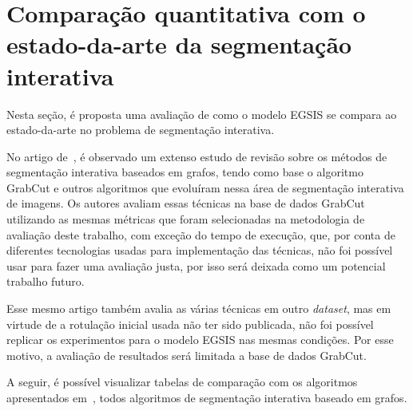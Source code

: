 \section{Comparação quantitativa com o estado-da-arte da segmentação interativa}\label{sec:comparacao-estado-da-arte}

Nesta seção, é proposta uma avaliação de como o modelo \gls{EGSIS} se
compara ao estado-da-arte no problema de segmentação interativa.

No artigo de~, é observado um extenso estudo de
revisão sobre os métodos de segmentação interativa baseados em grafos,
tendo como base o algoritmo GrabCut e outros algoritmos que evoluíram
nessa área de segmentação interativa de imagens. Os autores avaliam
essas técnicas na base de dados GrabCut~\cite{rother2004grabcut}
utilizando as mesmas métricas que foram selecionadas na metodologia de
avaliação deste trabalho, com exceção do tempo de execução, que, por
conta de diferentes tecnologias usadas para implementação das
técnicas, não foi possível usar para fazer uma avaliação justa, por
isso será deixada como um potencial trabalho futuro.

Esse mesmo artigo também avalia as várias técnicas em outro
\textit{dataset}, mas em virtude de a rotulação inicial usada não ter
sido publicada, não foi possível replicar os experimentos para o
modelo \gls{EGSIS} nas mesmas condições. Por esse motivo, a avaliação
de resultados será limitada a base de dados GrabCut.

A seguir, é possível visualizar tabelas de comparação com os
algoritmos apresentados em~, todos
algoritmos de segmentação interativa baseado em grafos.


